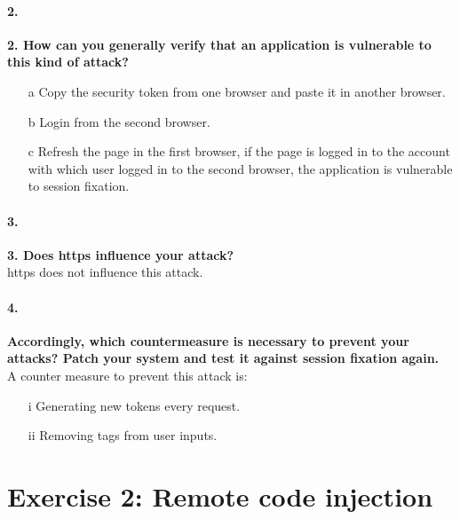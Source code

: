 \documentclass[12pt]{report}
\begin{document}
	\paragraph*{2.}{\bf 2. How can you generally verify that an application is vulnerable to this kind of attack?}\\
	
	\begin{itemize}
			
		\item[a] Copy the security token from one browser and paste it in another browser.
		\item[b] Login from the second browser.
		\item[c] Refresh the page in the first browser, if the page is logged in to the account with which user logged in to the second browser, the application is vulnerable to session fixation.
	\end{itemize}

	\paragraph*{3.}{\bf 3. Does https influence your attack?}\\
	
	https does not influence this attack.
	
	\paragraph*{4.}{\bf Accordingly, which countermeasure is necessary to prevent your attacks? Patch your system and test it against session fixation again.}\\
	
	A counter measure to prevent this attack is:
	
	\begin{itemize}
		\item[i] Generating new tokens every request.
		\item[ii] Removing tags from user inputs.
	\end{itemize}
		
		
	\section*{Exercise 2: Remote code injection}
	
	
\end{document}
